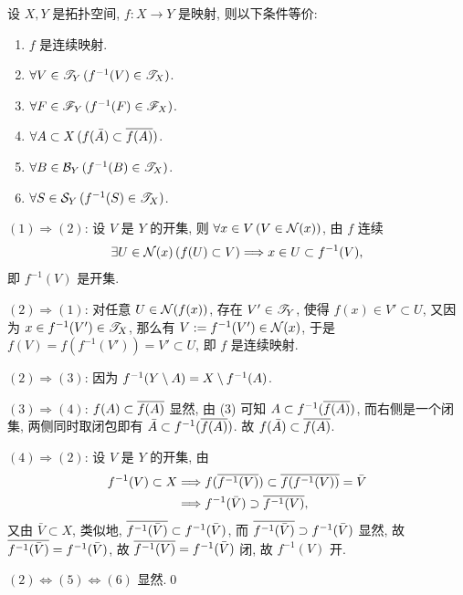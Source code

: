     \begin{Theorem}
        设 $ X, Y $ 是拓扑空间, $ f: X\to Y $ 是映射, 则以下条件等价:
        \begin{enumerate}
            \item $ f $ 是连续映射.
            \item $ \forall V\in\ST_{Y}\,(f^{-1}(V)\in \ST_{X}) $.
            \item $ \forall F\in\SF_{Y}\,(f^{-1}(F)\in \SF_{X}) $.
            \item $ \forall A\subset X\,(f(\bar{A})\subset\baro{f(A)}) $.
            \item $ \forall B\in\CB_{Y}\,(f^{-1}(B)\in\ST_{X}) $.
            \item $ \forall S\in\CS_{Y}\,(f^{-1}(S)\in\ST_{X}) $.
        \end{enumerate}
    \end{Theorem}
    \begin{Proof}
        $ (1)\Longrightarrow (2) $: 设 $ V $ 是 $ Y $ 的开集, 则 $ \forall x\in V\,(V\in\CN(x)) $, 由 $ f $ 连续
        \begin{align*}
            \exists U\in \CN(x)\,(f(U)\subset V)\Longrightarrow x\in U\subset f^{-1}(V),
        \end{align*}
        即 $ f^{-1}(V) $ 是开集.

        $ (2)\Longrightarrow (1) $: 对任意 $ U\in\CN(f(x)) $, 存在 $ V'\in\ST_{Y} $, 使得 $ f(x)\in V'\subset U $, 又因为 $ x\in f^{-1}(V')\in \ST_{X} $, 那么有 $ V:=f^{-1}(V')\in \CN(x) $, 于是 $ f(V)=f(f^{-1}(V'))=V'\subset U $, 即 $ f $ 是连续映射.

        $ (2)\Longrightarrow (3) $: 因为 $ f^{-1}(Y\sm A)=X\sm f^{-1}(A) $.

        $ (3)\Longrightarrow (4) $: $ f(A)\subset\baro{f(A)} $ 显然, 由 (3) 可知 $ A\subset f^{-1}(\baro{f(A)}) $, 而右侧是一个闭集, 两侧同时取闭包即有 $ \bar{A}\subset f^{-1}(\baro{f(A)}) $. 故 $ f(\bar{A})\subset\baro{f(A)} $.

        $ (4)\Longrightarrow (2) $: 设 $ V $ 是 $ Y $ 的开集, 由
        \begin{align*}
            f^{-1}(V)\subset X & \Longrightarrow f(\baro{f^{-1}(V)})\subset\baro{f(f^{-1}(V))}=\bar{V}\\
            & \Longrightarrow f^{-1}(\bar{V})\supset\baro{f^{-1}(V)},
        \end{align*}
        又由 $ \bar{V}\subset X $, 类似地, $ \baro{f^{-1}(\bar{V})}\subset f^{-1}(\bar{V}) $, 而 $ \baro{f^{-1}(\bar{V})}\supset f^{-1}(\bar{V}) $ 显然, 故 $ \baro{f^{-1}(\bar{V})}= f^{-1}(\bar{V}) $, 故 $ \baro{f^{-1}(V)}=f^{-1}(\bar{V}) $ 闭, 故 $ f^{-1}(V) $ 开. 

        $ (2)\Longleftrightarrow (5)\Longleftrightarrow (6) $ 显然.\qed
    \end{Proof}

